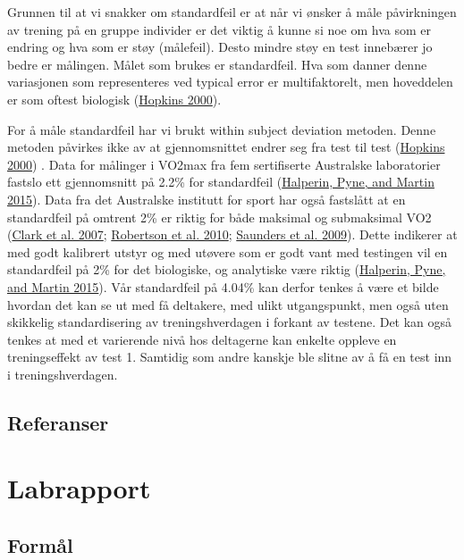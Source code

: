 \documentclass[
]{book}
\begin{document}
Grunnen til at vi snakker om standardfeil er at når vi ønsker å måle
påvirkningen av trening på en gruppe individer er det viktig å kunne si
noe om hva som er endring og hva som er støy (målefeil). Desto mindre
støy en test innebærer jo bedre er målingen. Målet som brukes er
standardfeil. Hva som danner denne variasjonen som representeres ved
typical error er multifaktorelt, men hoveddelen er som oftest biologisk
(\protect\hyperlink{ref-hopkins2000}{Hopkins 2000}).

For å måle standardfeil har vi brukt within subject deviation metoden.
Denne metoden påvirkes ikke av at gjennomsnittet endrer seg fra test til
test (\protect\hyperlink{ref-hopkins2000}{Hopkins 2000}) . Data for
målinger i VO2max fra fem sertifiserte Australske laboratorier fastslo
ett gjennomsnitt på 2.2\% for standardfeil
(\protect\hyperlink{ref-halperin2015}{Halperin, Pyne, and Martin 2015}).
Data fra det Australske institutt for sport har også fastslått at en
standardfeil på omtrent 2\% er riktig for både maksimal og submaksimal
VO2 (\protect\hyperlink{ref-clark2007}{Clark et al. 2007};
\protect\hyperlink{ref-robertson2010}{Robertson et al. 2010};
\protect\hyperlink{ref-saunders2009}{Saunders et al. 2009}). Dette
indikerer at med godt kalibrert utstyr og med utøvere som er godt vant
med testingen vil en standardfeil på 2\% for det biologiske, og
analytiske være riktig (\protect\hyperlink{ref-halperin2015}{Halperin,
Pyne, and Martin 2015}). Vår standardfeil på 4.04\% kan derfor tenkes å
være et bilde hvordan det kan se ut med få deltakere, med ulikt
utgangspunkt, men også uten skikkelig standardisering av
treningshverdagen i forkant av testene. Det kan også tenkes at med et
varierende nivå hos deltagerne kan enkelte oppleve en treningseffekt av
test 1. Samtidig som andre kanskje ble slitne av å få en test inn i
treningshverdagen.

\hypertarget{referanser}{%
\section{Referanser}\label{referanser}}

\hypertarget{labrapport}{%
\chapter{Labrapport}\label{labrapport}}

\hypertarget{formuxe5l}{%
\section{Formål}\label{formuxe5l}}
\end{document}
